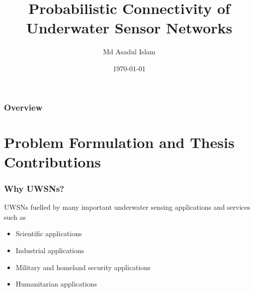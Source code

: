 \documentclass{beamer}
\title[Prob. Connectivity of USN]{Probabilistic Connectivity of Underwater Sensor Networks} %
\author{Md Asadul Islam} %
\institute[UofA] %
{
University of Alberta \\ %
\medskip
\textit{mdasadul@ualberta.ca} %
}
\date{\today} %
\begin{document}
\begin{frame}
\titlepage %
\end{frame}

\begin{frame}
\frametitle{Overview} %
\tableofcontents %
\end{frame}

\section{Problem Formulation and Thesis Contributions}


\begin{frame}
\frametitle{Why UWSNs?}
UWSNs fuelled by many important underwater sensing applications and services such as

\begin{itemize}
\item Scientific applications
\item Industrial applications
\item Military and homeland security applications
\item Humanitarian applications
\end{itemize}
\end{frame}
\end{document}
